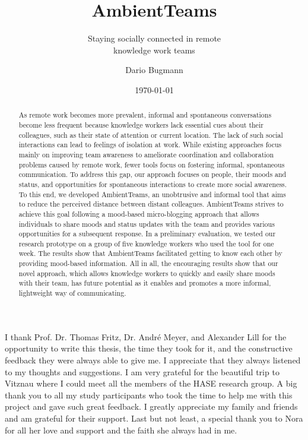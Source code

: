 \documentclass{seal_thesis}
\date{\today}
\title{AmbientTeams}
\subtitle{Staying socially connected in remote \\ knowledge work teams}
\author{Dario Bugmann}
\begin{document}
\maketitle

\frontmatter

\begin{acknowledgements}
    I thank Prof. Dr. Thomas Fritz, Dr. André Meyer, and Alexander Lill for the opportunity to write this thesis, the time they took for it, and the constructive feedback they were always able to give me. I appreciate that they always listened to my thoughts and suggestions. I am very grateful for the beautiful trip to Vitznau where I could meet all the members of the HASE research group. A big thank you to all my study participants who took the time to help me with this project and gave such great feedback. I greatly appreciate my family and friends and am grateful for their support. Last but not least, a special thank you to Nora for all her love and support and the faith she always had in me.
\end{acknowledgements}

\begin{abstract}
    As remote work becomes more prevalent, informal and spontaneous conversations become less frequent because knowledge workers lack essential cues about their colleagues, such as their state of attention or current location.  The lack of such social interactions can lead to feelings of isolation at work. While existing approaches focus mainly on improving team awareness to ameliorate coordination and collaboration problems caused by remote work, fewer tools focus on fostering informal, spontaneous communication. To address this gap, our approach focuses on people, their moods and status, and opportunities for spontaneous interactions to create more social awareness. To this end, we developed AmbientTeams, an unobtrusive and informal tool that aims to reduce the perceived distance between distant colleagues. AmbientTeams strives to achieve this goal following a mood-based micro-blogging approach that allows individuals to share moods and status updates with the team and provides various opportunities for a subsequent response. In a preliminary evaluation, we tested our research prototype on a group of five knowledge workers who used the tool for one week. The results show that AmbientTeams facilitated getting to know each other by providing mood-based information. All in all, the encouraging results show that our novel approach, which allows knowledge workers to quickly and easily share moods with their team, has future potential as it enables and promotes a more informal, lightweight way of communicating.
\end{abstract}
\end{document}
